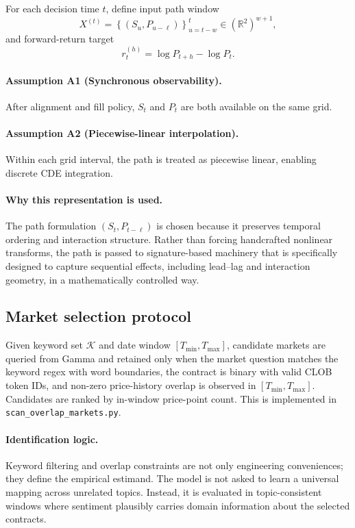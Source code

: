 \documentclass[11pt]{article}
\begin{document}
For each decision time \(t\), define input path window
\[
X^{(t)} = \left\{(S_u, P_{u-\ell})\right\}_{u=t-w}^{t} \in (\mathbb{R}^2)^{w+1},
\]
and forward-return target
\[
r_t^{(h)} = \log P_{t+h} - \log P_t.
\]

\paragraph{Assumption A1 (Synchronous observability).}
After alignment and fill policy, \(S_t\) and \(P_t\) are both available on the same grid.

\paragraph{Assumption A2 (Piecewise-linear interpolation).}
Within each grid interval, the path is treated as piecewise linear, enabling discrete CDE integration.
\paragraph{Why this representation is used.}
The path formulation \((S_t, P_{t-\ell})\) is chosen because it preserves temporal ordering and interaction structure. Rather than forcing handcrafted nonlinear transforms, the path is passed to signature-based machinery that is specifically designed to capture sequential effects, including lead--lag and interaction geometry, in a mathematically controlled way.

\subsection{Market selection protocol}
Given keyword set \(\mathcal{K}\) and date window \([T_{\min}, T_{\max}]\), candidate markets are queried from Gamma and retained only when the market question matches the keyword regex with word boundaries, the contract is binary with valid CLOB token IDs, and non-zero price-history overlap is observed in \([T_{\min}, T_{\max}]\). Candidates are ranked by in-window price-point count. This is implemented in \texttt{scan\_overlap\_markets.py}.
\paragraph{Identification logic.}
Keyword filtering and overlap constraints are not only engineering conveniences; they define the empirical estimand. The model is not asked to learn a universal mapping across unrelated topics. Instead, it is evaluated in topic-consistent windows where sentiment plausibly carries domain information about the selected contracts.
\end{document}
